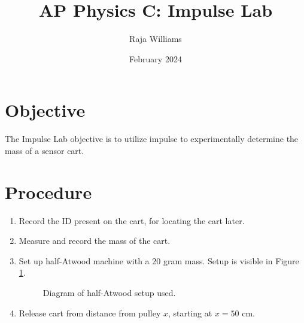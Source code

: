 \documentclass[twocolumn]{article}
\begin{document}
\title{AP Physics C: Impulse Lab}
\author{Raja Williams}
\date{February 2024}
\maketitle

\section{Objective}
The Impulse Lab objective is to utilize impulse to experimentally determine the mass
of a sensor cart.

\section{Procedure}
\begin{enumerate}

    \item Record the ID present on the cart, for locating the cart later.

    \item Measure and record the mass of the cart.
    
    \item Set up half-Atwood machine with a 20 gram mass. Setup is visible in
        Figure \ref{fig:atwood}.

        \begin{figure}[h]
            \centering
            \caption{Diagram of half-Atwood setup used.}
            \label{fig:atwood}
        \end{figure}

    \item \label{enm:release} Release cart from distance from pulley $x$,
        starting at $x = 50$ cm.


\end{enumerate}
\end{document}
